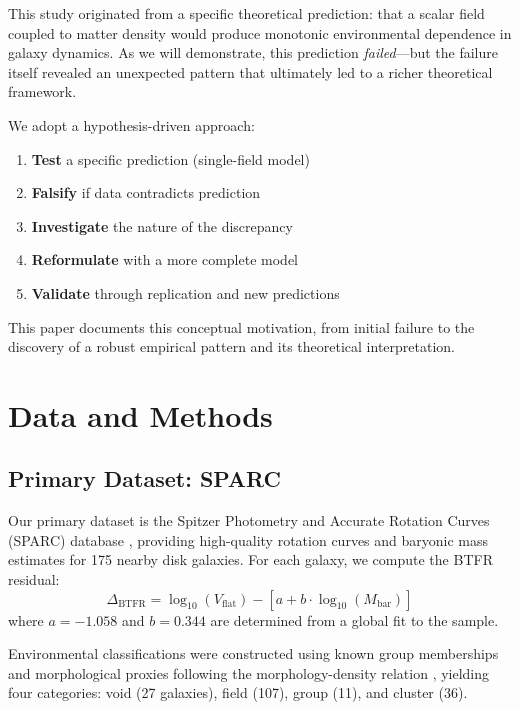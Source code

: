 \documentclass[12pt,a4paper]{article}
\newcommand{\Mbar}{M_{\text{bar}}}
\newcommand{\Vflat}{V_{\text{flat}}}
\begin{document}
This study originated from a specific theoretical prediction: that a scalar field coupled to matter density would produce monotonic environmental dependence in galaxy dynamics. As we will demonstrate, this prediction \textit{failed}---but the failure itself revealed an unexpected pattern that ultimately led to a richer theoretical framework.

We adopt a hypothesis-driven approach:
\begin{enumerate}
    \item \textbf{Test} a specific prediction (single-field model)
    \item \textbf{Falsify} if data contradicts prediction
    \item \textbf{Investigate} the nature of the discrepancy
    \item \textbf{Reformulate} with a more complete model
    \item \textbf{Validate} through replication and new predictions
\end{enumerate}

This paper documents this conceptual motivation, from initial failure to the discovery of a robust empirical pattern and its theoretical interpretation.

\section{Data and Methods}
\label{sec:data}

\subsection{Primary Dataset: SPARC}

Our primary dataset is the Spitzer Photometry and Accurate Rotation Curves (SPARC) database \citep{Lelli2016}, providing high-quality rotation curves and baryonic mass estimates for 175 nearby disk galaxies. For each galaxy, we compute the BTFR residual:
\begin{equation}
\Delta_{\text{BTFR}} = \log_{10}(\Vflat) - \left[ a + b \cdot \log_{10}(\Mbar) \right]
\label{eq:residual}
\end{equation}
where $a = -1.058$ and $b = 0.344$ are determined from a global fit to the sample.

Environmental classifications were constructed using known group memberships and morphological proxies following the morphology-density relation \citep{Dressler1980}, yielding four categories: void (27 galaxies), field (107), group (11), and cluster (36).
\end{document}
